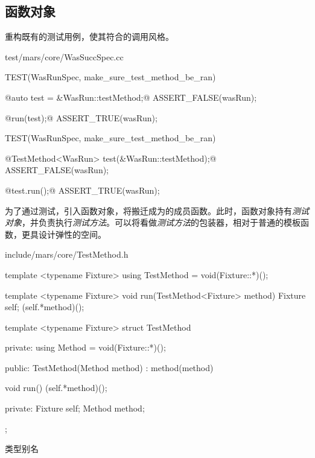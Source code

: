 \begin{content}
\subsection{函数对象}

重构既有的测试用例，使其符合的调用风格。

\begin{diff}{test/mars/core/WasSuccSpec.cc}
\begin{minicpp}
TEST(WasRunSpec, make_sure_test_method_be_ran) {
  @auto test = &WasRun::testMethod;@  
  ASSERT_FALSE(wasRun);

  @run(test);@
  ASSERT_TRUE(wasRun);
}
\end{minicpp}
\tcblower
\begin{minicpp}
TEST(WasRunSpec, make_sure_test_method_be_ran) {
  @TestMethod<WasRun> test(&WasRun::testMethod);@
  ASSERT_FALSE(wasRun);

  @test.run();@
  ASSERT_TRUE(wasRun);
}
\end{minicpp}
\end{diff}

为了通过测试，引入函数对象，将搬迁成为的成员函数。此时，函数对象持有\emph{测试对象}，并负责执行\emph{测试方法}。可以将看做\emph{测试方法}的包装器，相对于普通的模板函数，更具设计弹性的空间。

\begin{diff}{include/mars/core/TestMethod.h}
\begin{minicpp}
template <typename Fixture>
using TestMethod = void(Fixture::*)();

template <typename Fixture>
void run(TestMethod<Fixture> method) {
  Fixture self;
  (self.*method)();
}
\end{minicpp}
\tcblower
\begin{minicpp}
template <typename Fixture>
struct TestMethod {
private:
  using Method = void(Fixture::*)();

public:
  TestMethod(Method method)
    : method(method) {}

  void run() {
    (self.*method)();
  }

private:
  Fixture self;
  Method method;
};
\end{minicpp}
\end{diff}

\begin{episode}{类型别名}
\begin{content}


\end{content}
\end{episode}
\end{content}
